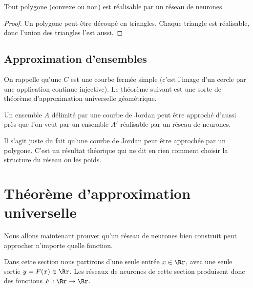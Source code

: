 \documentclass[11pt,class=report,crop=false]{standalone}
\begin{document}
\begin{proposition}
Tout polygone (convexe ou non) est réalisable par un réseau de neurones.
\end{proposition}

\begin{proof}
Un polygone peut être découpé en triangles. Chaque triangle est réalisable, donc l'union des triangles l'est aussi.



\end{proof}

\subsection{Approximation d'ensembles}



On rappelle qu'une  $C$ est une courbe fermée simple (c'est l'image d'un cercle par une application continue injective). Le théorème suivant est une sorte de théorème d'approximation universelle géométrique.

\begin{theoreme}
Un ensemble $A$ délimité par une courbe de Jordan peut être approché d'aussi près que l'on veut par un ensemble $A'$ réalisable par un réseau de neurones.
\end{theoreme}

Il s'agit juste du fait qu'une courbe de Jordan peut être approchée par un polygone.
C'est un résultat théorique qui ne dit en rien comment choisir la structure du réseau ou les poids.





\section{Théorème d'approximation universelle}

Nous allons maintenant prouver qu'un réseau de neurones bien construit peut approcher n'importe quelle fonction. 

Dans cette section nous partirons d'une seule entrée $x \in \Rr$, avec une seule sortie $y = F(x) \in \Rr$. Les réseaux de neurones de cette section produisent donc des fonctions $F : \Rr \to \Rr$.
\end{document}
